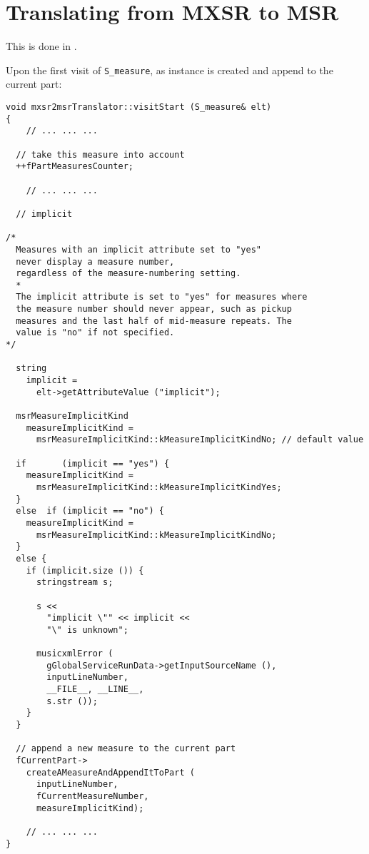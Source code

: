 \section{Translating from MXSR to MSR}

This is done in \mxsrToMsr{}.

Upon the first visit of {\tt S_measure}, as  instance is created and append to the current part:
\begin{lstlisting}[language=CPlusPlus]
void mxsr2msrTranslator::visitStart (S_measure& elt)
{
	// ... ... ...

  // take this measure into account
  ++fPartMeasuresCounter;

	// ... ... ...

  // implicit

/*
  Measures with an implicit attribute set to "yes"
  never display a measure number,
  regardless of the measure-numbering setting.
  *
  The implicit attribute is set to "yes" for measures where
  the measure number should never appear, such as pickup
  measures and the last half of mid-measure repeats. The
  value is "no" if not specified.
*/

  string
    implicit =
      elt->getAttributeValue ("implicit");

  msrMeasureImplicitKind
    measureImplicitKind =
      msrMeasureImplicitKind::kMeasureImplicitKindNo; // default value

  if       (implicit == "yes") {
    measureImplicitKind =
      msrMeasureImplicitKind::kMeasureImplicitKindYes;
  }
  else  if (implicit == "no") {
    measureImplicitKind =
      msrMeasureImplicitKind::kMeasureImplicitKindNo;
  }
  else {
    if (implicit.size ()) {
      stringstream s;

      s <<
        "implicit \"" << implicit <<
        "\" is unknown";

      musicxmlError (
        gGlobalServiceRunData->getInputSourceName (),
        inputLineNumber,
        __FILE__, __LINE__,
        s.str ());
    }
  }

  // append a new measure to the current part
  fCurrentPart->
    createAMeasureAndAppendItToPart (
      inputLineNumber,
      fCurrentMeasureNumber,
      measureImplicitKind);

	// ... ... ...
}
\end{lstlisting}

